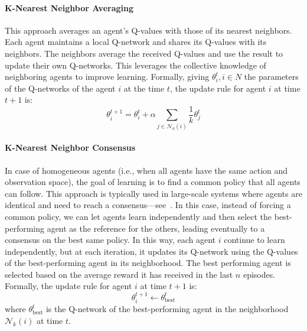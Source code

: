 \documentclass[sigconf]{acmart}
\begin{document}
\paragraph{K-Nearest Neighbor Averaging}
\sloppy
This approach averages an agent's Q-values with those of its nearest neighbors. 
Each agent maintains a local Q-network and shares its Q-values with its neighbors. 
The neighbors average the received Q-values and use the result to update their own Q-networks. 
This leverages the collective knowledge of neighboring agents to improve learning.
%
Formally, giving $\theta^t_i, i \in N$ the parameters of the Q-networks of the agent $i$ at the time $t$,
the update rule for agent $i$ at time $t+1$ is:
\begin{equation}
  \theta^{t+1}_i = \theta^t_i + \alpha \sum_{j \in \mathcal{N}_k(i)} \frac{1}{k} \theta^t_j
\end{equation}

\paragraph{K-Nearest Neighbor Consensus}
In case of homogeneous agents (i.e., when all agents have the same action and observation space),
the goal of learning is to find a common policy that all agents can follow.
This approach is typically used in large-scale systems where agents are identical and need to reach a consensus---see~\cite{DBLP:conf/eusipco/BaldazoPZ19}.
%
In this case, instead of forcing a common policy, we can let agents learn independently and then select the best-performing agent as the reference for the others, leading eventually to a consensus on the best same policy.
%
In this way, each agent $i$ continue to learn independently, but at each iteration, it updates its Q-network using the Q-values of the best-performing agent in its neighborhood.
%
The best performing agent is selected based on the average reward it has received in the last $n$ episodes.
Formally, the update rule for agent $i$ at time $t+1$ is:
\begin{equation}
  \theta^{t+1}_i \leftarrow \theta^t_{\text{best}}
\end{equation}
where $\theta^t_{\text{best}}$ is the Q-network of the best-performing agent in the neighborhood $\mathcal{N}_k(i)$ at time $t$.
\end{document}
